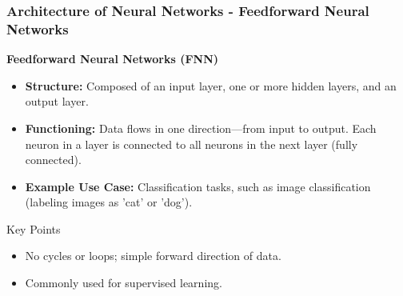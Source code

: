 \documentclass[aspectratio=169]{beamer}
\begin{document}
\begin{frame}[fragile]
  \frametitle{Architecture of Neural Networks - Feedforward Neural Networks}
  
  \textbf{Feedforward Neural Networks (FNN)}
  
  \begin{itemize}
    \item \textbf{Structure:} Composed of an input layer, one or more hidden layers, and an output layer.
    \item \textbf{Functioning:} Data flows in one direction—from input to output. Each neuron in a layer is connected to all neurons in the next layer (fully connected).
    \item \textbf{Example Use Case:} Classification tasks, such as image classification (labeling images as 'cat' or 'dog').
  \end{itemize}

  \begin{block}{Key Points}
    \begin{itemize}
      \item No cycles or loops; simple forward direction of data.
      \item Commonly used for supervised learning.
    \end{itemize}
  \end{block}
  
\end{frame}
\end{document}
